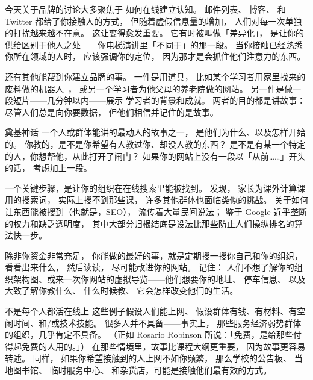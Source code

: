 今天关于品牌的讨论大多聚焦于
如何在线建立认知。
邮件列表、
博客、
和 Twitter 都给了你接触人的方式，
但随着虚假信息量的增加，
人们对每一次单独的打扰越来越不在意。
这让变得愈发重要。
它有时被叫做「差异化」，
是让你的供给区别于他人之处——你电梯演讲里「不同于」的那一段。
当你接触已经熟悉你所在领域的人时，
应该强调你的定位，
因为那才是会抓住他们注意力的东西。

还有其他能帮到你建立品牌的事。
一件是用道具，
比如某个学习者用家里找来的废料做的机器人~\cite{Schw2013}，
或另一个学习者为他父母的养老院做的网站。
另一件是做一段短片——几分钟以内——展示
学习者的背景和成就。
两者的目的都是讲故事：
尽管人们总是向你要数据，
但他们相信并记住的是故事。

\begin{aside}{奠基神话}
  一个人或群体能讲的最动人的故事之一，
  是他们为什么、以及怎样开始的。
  你教的，是不是你希望有人教过你、却没人教的东西？
  是不是有某一个特定的人，你想帮他，从此打开了闸门？
  如果你的网站上没有一段以「从前……」开头的话，
  考虑加上一段。
\end{aside}

一个关键步骤，是让你的组织在在线搜索里能被找到。
\cite{DiSa2014b}发现，
家长为课外计算课用的搜索词，
实际上搜不到那些课，
许多其他群体也面临类似的挑战。
关于如何让东西能被搜到（也就是，SEO），
流传着大量民间说法；
鉴于 Google 近乎垄断的权力和缺乏透明度，
其中大部分归根结底是设法比那些防止人们操纵排名的算法快一步。

除非你资金非常充足，
你能做的最好的事，就是定期搜一搜你自己和你的组织，
看看出来什么，
然后读读，
尽可能改进你的网站。
记住：
人们不想了解你的组织架构图、或来一次你网站的虚拟导览——他们想要你的地址、
停车信息、
以及大致了解你教什么、
什么时候教、
它会怎样改变他们的生活。

\begin{aside}{不是每个人都活在线上}
  这些例子假设人们能上网、
  假设群体有钱、有材料、有空闲时间、和/或技术技能。
  很多人并不具备——事实上，
  那些服务经济弱势群体的组织，几乎肯定不具备。
  （正如 Rosario Robinson 所说：「免费，是给那些付得起免费的人用的。」）
  在那些情境里，故事比课程大纲更重要，
  因为故事更容易转述。
  同样，
  如果你希望接触到的人上网不如你频繁，
  那么学校的公告板、
  当地图书馆、
  临时服务中心、
  和杂货店，可能是接触他们最有效的方式。
\end{aside}


